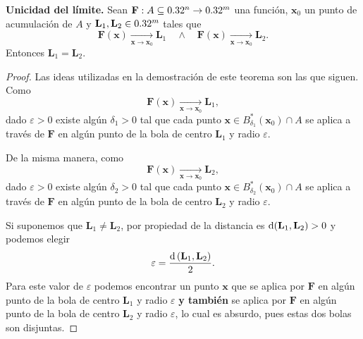 \begin{theorem}\textbf{Unicidad del l\'imite.} \label{teo:unicidad_limite} Sean $\mathbf{F}:A  \subseteq  0.32^n \to 0.32^m$ una funci\'on, $\mathbf{x}_0$ un punto de acumulaci\'on de $A$ y $\mathbf{L}_1, \mathbf{L}_2 \in 0.32^m$ tales que 
\[
 \mathbf{F}(\mathbf{x}) \xrightarrow[\mathbf{x} \to \mathbf{x}_0]{} \mathbf{L}_1 \quad \wedge \quad \mathbf{F}(\mathbf{x}) \xrightarrow[\mathbf{x} \to \mathbf{x}_0]{} \mathbf{L}_2.
\]
Entonces $\mathbf{L}_1 = \mathbf{L}_2$.
\begin{proof}
\mbox{}

Las ideas utilizadas en la demostraci\'on de este teorema son las que siguen.\\
Como 
\[
 \mathbf{F}(\mathbf{x}) \xrightarrow[\mathbf{x} \to \mathbf{x}_0]{} \mathbf{L}_1,
\]
dado $\varepsilon > 0$ existe alg\'un $\delta_1 > 0$ tal que cada punto $\mathbf{x} \in B_{\delta_1}^*(\mathbf{x}_0) \cap A$ se aplica a trav\'es de $\mathbf{F}$ en alg\'un punto de la bola de centro $\mathbf{L}_1$ y radio $\varepsilon$.

\def\Ro{2.0}
\def\Rb{1.0}
\def\Ra{3.0}
\def\sep{1.0*\Ro}



De la misma manera, como 
\[
 \mathbf{F}(\mathbf{\mathbf{x}}) \xrightarrow[\mathbf{\mathbf{x}} \to \mathbf{\mathbf{x}}_0]{} \mathbf{L}_2,
\]
dado $\varepsilon > 0$ existe alg\'un $\delta_2 > 0$ tal que cada punto $\mathbf{\mathbf{x}} \in B_{\delta_2}^*(\mathbf{\mathbf{x}}_0) \cap A$ se aplica a trav\'es de $\mathbf{F}$ en alg\'un punto de la bola de centro $\mathbf{L}_2$ y radio $\varepsilon$.



Si suponemos que $\mathbf{L}_1 \ne \mathbf{L}_2$, por propiedad de la distancia es $\operatorname{d}(\mathbf{L}_1,\mathbf{L}_2) > 0$ y podemos elegir 
\[
 \varepsilon = \frac{\operatorname{d}{(\mathbf{L}_1,\mathbf{L}_2)}}{2}.
\]
Para este valor de $\varepsilon$ podemos encontrar un punto $\mathbf{\mathbf{x}}$ que se aplica por $\mathbf{F}$ en alg\'un punto de la bola de centro $\mathbf{L}_1$ y radio $\varepsilon$ \textbf{y tambi\'en} se aplica por $\mathbf{F}$ en alg\'un punto de la bola de centro $\mathbf{L}_2$ y radio $\varepsilon$, lo cual es absurdo, pues estas dos bolas son disjuntas.




\end{proof}
\end{theorem}
